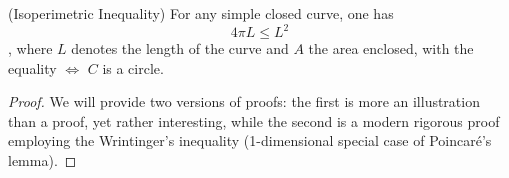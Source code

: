 \begin{theorem}(Isoperimetric Inequality)
	For any simple closed curve, one has \[4\pi L \leq L^2\], where $L$ denotes the length of the curve and $A$ the area enclosed, with the equality $\iff$ $C$ is a circle.
\end{theorem}
\begin{proof} We will provide two versions of proofs: the first is more an illustration than a proof, yet rather interesting, while the second is a modern rigorous proof employing the Wrintinger's inequality (1-dimensional special case of Poincar\'e's lemma).

\end{proof}